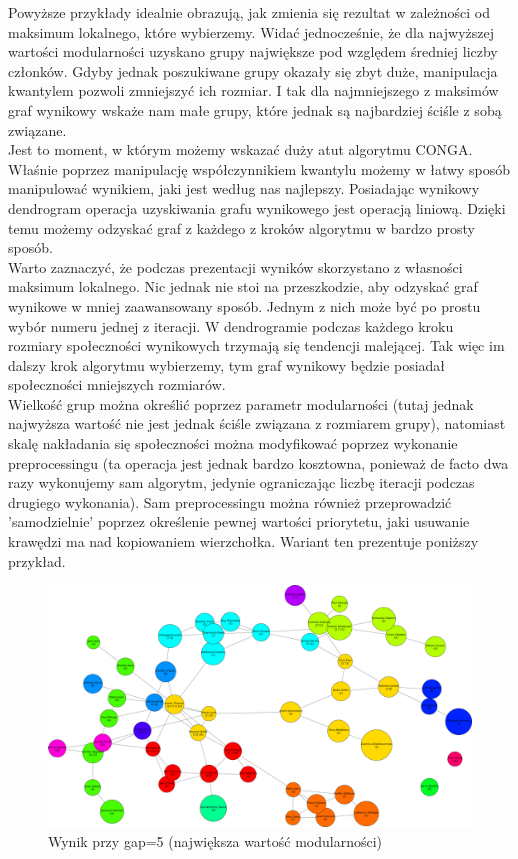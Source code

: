 \documentclass{article}
\begin{document}
Powyższe przykłady idealnie obrazują, jak zmienia się rezultat w zależności od maksimum lokalnego, które wybierzemy. Widać jednocześnie, że dla najwyższej wartości modularności uzyskano grupy największe pod względem średniej liczby członków. Gdyby jednak poszukiwane grupy okazały się zbyt duże, manipulacja kwantylem pozwoli zmniejszyć ich rozmiar. I tak dla najmniejszego z maksimów graf wynikowy wskaże nam małe grupy, które jednak są najbardziej ściśle z sobą związane. \\

Jest to moment, w którym możemy wskazać duży atut algorytmu CONGA. Właśnie poprzez manipulację współczynnikiem kwantylu możemy w łatwy sposób manipulować wynikiem, jaki jest według nas najlepszy. Posiadając wynikowy dendrogram operacja uzyskiwania grafu wynikowego jest operacją liniową. Dzięki temu możemy odzyskać graf z każdego z kroków algorytmu w bardzo prosty sposób. \\

Warto zaznaczyć, że podczas prezentacji wyników skorzystano z własności maksimum lokalnego. Nic jednak nie stoi na przeszkodzie, aby odzyskać graf wynikowe w mniej zaawansowany sposób. Jednym z nich może być po prostu wybór numeru jednej z iteracji. W dendrogramie podczas każdego kroku rozmiary społeczności wynikowych trzymają się tendencji malejącej. Tak więc im dalszy krok algorytmu wybierzemy, tym graf wynikowy będzie posiadał społeczności mniejszych rozmiarów. \\

Wielkość grup można określić poprzez parametr modularności (tutaj jednak najwyższa wartość nie jest jednak ściśle związana z rozmiarem grupy), natomiast skalę nakładania się społeczności można modyfikować poprzez wykonanie preprocessingu (ta operacja jest jednak bardzo kosztowna, ponieważ de facto dwa razy wykonujemy sam algorytm, jedynie ograniczając liczbę iteracji podczas drugiego wykonania). Sam preprocessingu można również przeprowadzić 'samodzielnie' poprzez określenie pewnej wartości priorytetu, jaki usuwanie krawędzi ma nad kopiowaniem wierzchołka. Wariant ten prezentuje poniższy przykład.\\

\begin{figure}[H]
\centering
\includegraphics[width=\textwidth]{images/is-sample-4.png}
\caption{Wynik przy gap=5 (największa wartość modularności)}
\end{figure}
\end{document}
